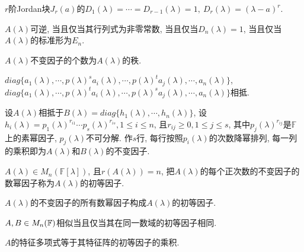 
\begin{example}
    $r$阶Jordan块$J_r(a)$的$D_1(\lambda)=\cdots=D_{r-1}(\lambda)=1,\ D_r(\lambda)=(\lambda-a)^r$.
\end{example}

\begin{example}
    $A(\lambda)$可逆, 当且仅当其行列式为非零常数, 当且仅当$D_n(\lambda)=1$, 当且仅当$A(\lambda)$的标准形为$E_n$.
\end{example}

\begin{statement}
    $A(\lambda)$不变因子的个数为$A(\lambda)$的秩.
\end{statement}

\begin{lemma}
    $diag\{a_1(\lambda),\cdots,p(\lambda)^sa_i(\lambda),\cdots,p(\lambda)^ta_j(\lambda),\cdots,a_n(\lambda)\}$,\\
    $diag\{a_1(\lambda),\cdots,p(\lambda)^ta_i(\lambda),\cdots,p(\lambda)^sa_j(\lambda),\cdots,a_n(\lambda)\}$相抵.
\end{lemma}

\begin{lemma}
    设$A(\lambda)$相抵于$B(\lambda)=diag\{h_1(\lambda),\cdots,h_n(\lambda)\}$, 
    设$h_i(\lambda)=p_1(\lambda)^{r_{i1}}\cdots p_s(\lambda)^{r_{is}}, 1\le i \le n$, 
    且$r_{ij}\ge 0, 1\le j \le s$, 其中$p_j(\lambda)^{r_{ij}}$是$\mathbb{F}$上的素幂因子, $p_j(\lambda)$不可分解. 
    作$s$行, 每行按照$p_i(\lambda)$的次数降幂排列, 每一列的乘积即为$A(\lambda)$和$B(\lambda)$的不变因子.
\end{lemma}

\begin{definition}[初等因子]
    $A(\lambda)\in M_n(\mathbb{F}[\lambda])$, 且$r(A(\lambda))=n$, 把$A(\lambda)$的每个正次数的不变因子的数幂因子称为$A(\lambda)$的初等因子.
\end{definition}

\begin{inference}
    $A(\lambda)$的不变因子的所有数幂因子构成$A(\lambda)$的初等因子.
\end{inference}

\begin{theorem}[矩阵相似的充要条件]
    $A,B\in M_{n}(\mathbb{F})$相似当且仅当其在同一数域的初等因子相同.
\end{theorem}

\begin{example}
    $A$的特征多项式等于其特征阵的初等因子的乘积.
\end{example}

